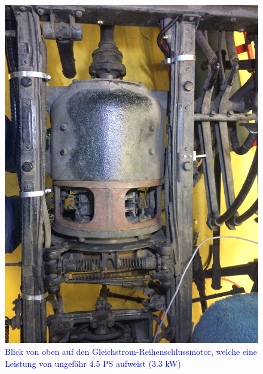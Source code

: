 \begin{landscape}
\begin{figure}[h]
		\includegraphics[angle=180,width=1.30\textwidth]{images/Anhang/Motor.jpg}
	\caption{\textcolor{blue}{Blick von oben auf den Gleichstrom-Reihenschlussmotor, welche eine Leistung von ungefähr $4.5$ PS aufweist ($3.3$ kW)}}
	\label{fig:Motor}
\end{figure}
\begin{figure}[h]
	\centering

\end{figure}
\end{landscape}
